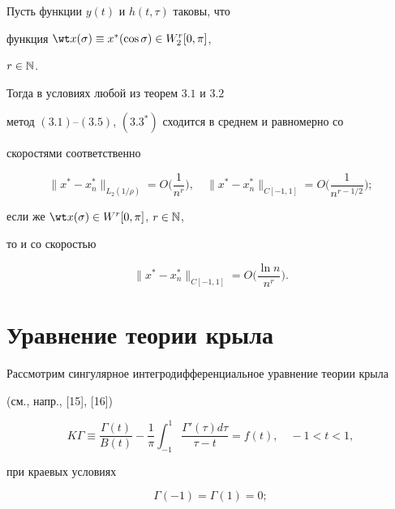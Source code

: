 \begin{thms}


Пусть функции $y(t)$ и $h(t,\tau)$ таковы, что


функция $\wt x(\sigma) \equiv x^*(\cos \sigma)\in W_2^r[0,\pi]$,


$r\in \Bbb N$.


Тогда в условиях любой из теорем $3.1$ и $3.2$


метод $(3.1)$--$(3.5)$, $(3.3^*)$ сходится  в среднем и равномерно со


скоростями соответственно


$$


\|x^*-x^*_n\|_{L_2(1/\rho)}=O\bigg(\frac{1}{n^r}\bigg),\quad


\|x^*-x^*_n\|_{C[-1,1]}=O\bigg(\frac{1}{n^{r-1/2}}\bigg);


$$


если же $\wt x(\sigma)\in W^r[0,\pi]$, $r\in \Bbb N$,


то и со скоростью


$$


\|x^*-x^*_n\|_{C[-1,1]}=O\bigg(\frac{\ln n}{n^r}\bigg).


$$


\end{thms}





\section{Уравнение теории крыла}





Рассмотрим сингулярное интегродифференциальное уравнение теории крыла


(см., напр., [15], [16])


\begin{equation}


K\Gamma\equiv


\frac{\Gamma(t)}{B(t)}-\frac{1}{\pi}\int_{-1}^{1}


\frac{\Gamma'(\tau)d\tau}{\tau-t}=f(t),\quad -1< t< 1,


\end{equation}


при краевых условиях


\begin{equation}


\Gamma(-1)=\Gamma(1)=0;


\end{equation}


